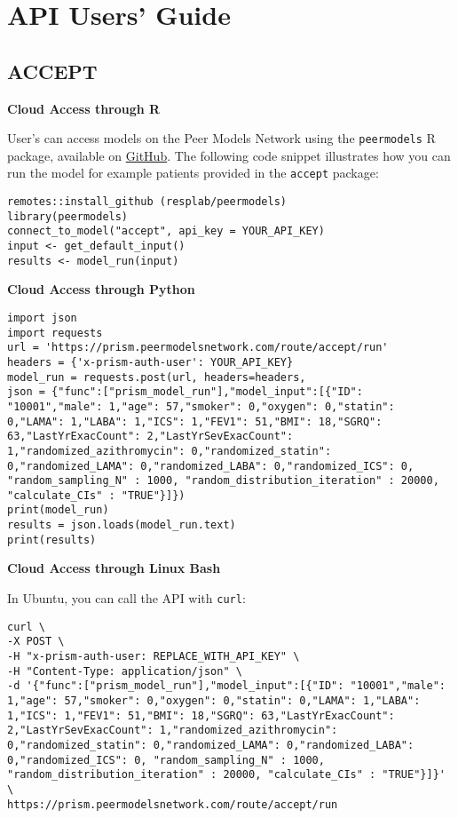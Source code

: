 \documentclass[
]{book}
\begin{document}
\hypertarget{api-users-guide}{%
\chapter{API Users' Guide}\label{api-users-guide}}

\hypertarget{accept-1}{%
\section{ACCEPT}\label{accept-1}}

\textbf{Cloud Access through R}

User's can access models on the Peer Models Network using the \texttt{peermodels} R package, available on \href{https://github.com/resplab/peermodels}{GitHub}. The following code snippet illustrates how you can run the model for example patients provided in the \texttt{accept} package:

\begin{verbatim}
remotes::install_github (resplab/peermodels)
library(peermodels)
connect_to_model("accept", api_key = YOUR_API_KEY)
input <- get_default_input()
results <- model_run(input)
\end{verbatim}

\textbf{Cloud Access through Python}

\begin{verbatim}
import json
import requests
url = 'https://prism.peermodelsnetwork.com/route/accept/run'
headers = {'x-prism-auth-user': YOUR_API_KEY}
model_run = requests.post(url, headers=headers,
json = {"func":["prism_model_run"],"model_input":[{"ID": "10001","male": 1,"age": 57,"smoker": 0,"oxygen": 0,"statin": 0,"LAMA": 1,"LABA": 1,"ICS": 1,"FEV1": 51,"BMI": 18,"SGRQ": 63,"LastYrExacCount": 2,"LastYrSevExacCount": 1,"randomized_azithromycin": 0,"randomized_statin": 0,"randomized_LAMA": 0,"randomized_LABA": 0,"randomized_ICS": 0, "random_sampling_N" : 1000, "random_distribution_iteration" : 20000, "calculate_CIs" : "TRUE"}]})
print(model_run)
results = json.loads(model_run.text)
print(results)
\end{verbatim}

\textbf{Cloud Access through Linux Bash}

In Ubuntu, you can call the API with \texttt{curl}:

\begin{verbatim}
curl \
-X POST \
-H "x-prism-auth-user: REPLACE_WITH_API_KEY" \
-H "Content-Type: application/json" \
-d '{"func":["prism_model_run"],"model_input":[{"ID": "10001","male": 1,"age": 57,"smoker": 0,"oxygen": 0,"statin": 0,"LAMA": 1,"LABA": 1,"ICS": 1,"FEV1": 51,"BMI": 18,"SGRQ": 63,"LastYrExacCount": 2,"LastYrSevExacCount": 1,"randomized_azithromycin": 0,"randomized_statin": 0,"randomized_LAMA": 0,"randomized_LABA": 0,"randomized_ICS": 0, "random_sampling_N" : 1000, "random_distribution_iteration" : 20000, "calculate_CIs" : "TRUE"}]}' \
https://prism.peermodelsnetwork.com/route/accept/run
\end{verbatim}

  
\end{document}

